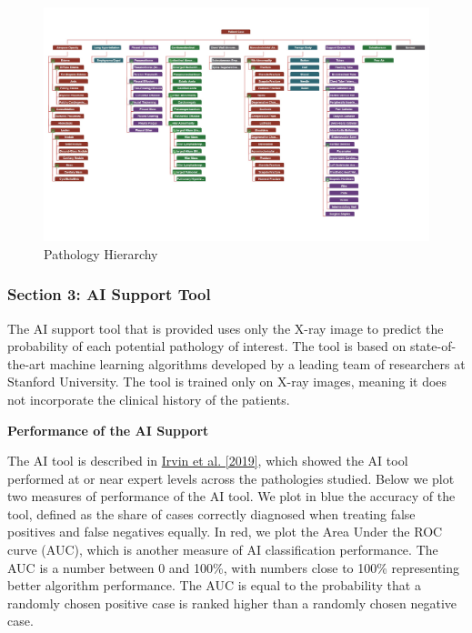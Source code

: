 \begin{figure}[H]
\caption{Pathology Hierarchy}

\begin{center}
\includegraphics[width=1\textwidth]{images/pat_hierarchy.pdf}
\end{center}
\end{figure}


\subsubsection*{Section 3: AI Support Tool}

The AI support tool that is provided uses only the X-ray image to
predict the probability of each potential pathology of interest. The
tool is based on state-of-the-art machine learning algorithms developed
by a leading team of researchers at Stanford University. The tool
is trained only on X-ray images, meaning it does not incorporate the
clinical history of the patients.

\textbf{Performance of the AI Support}

The AI tool is described in \href{https://arxiv.org/abs/1901.07031}{Irvin et al. [2019]},
which showed the AI tool performed at or near expert levels across
the pathologies studied. Below we plot two measures of performance
of the AI tool. We plot in blue the accuracy of the tool, defined
as the share of cases correctly diagnosed when treating false positives
and false negatives equally. In red, we plot the Area Under the ROC
curve (AUC), which is another measure of AI classification performance.
The AUC is a number between 0 and 100\%, with numbers close to 100\%
representing better algorithm performance. The AUC is equal to the
probability that a randomly chosen positive case is ranked higher
than a randomly chosen negative case.

